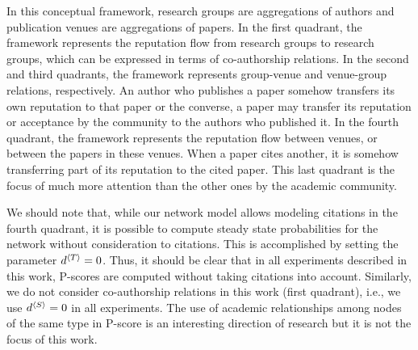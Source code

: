 \documentclass[notitlepage]{svjour3}
\begin{document}
In this conceptual framework, research groups are 
aggregations of authors and publication venues are aggregations of papers.
In the first quadrant, the framework represents the reputation
flow from research groups to research groups, which can be expressed in
terms of co-authorship relations. In the second and 
third quadrants, the framework
represents group-venue and venue-group relations,
respectively. An author who publishes a paper somehow
transfers its own reputation to that paper or the converse,
a paper may transfer its reputation or acceptance by the
community to the authors who published it. In the fourth
quadrant, the framework represents the reputation flow between
venues, or between the papers in these venues. When a paper cites 
another, it is somehow
transferring part of its reputation to the cited paper. This
last quadrant is the focus of much more attention than the
other ones by the academic community. 

We should note that, while our network model allows modeling citations in the fourth quadrant, it is possible to compute 
steady state probabilities for the network without consideration to citations. This is accomplished by setting the parameter 
$d{^{\langle T \rangle}} = 0$. Thus, it should be clear that in all experiments described in this work, P-scores 
are computed without taking citations into account. 
Similarly, we do not consider co-authorship relations in this work (first quadrant), i.e., we use $d{^{\langle S \rangle}} = 0$ in all experiments. The use of academic relationships among nodes of the same type in P-score is an interesting direction of research but it is not the focus of this work.%
\end{document}
